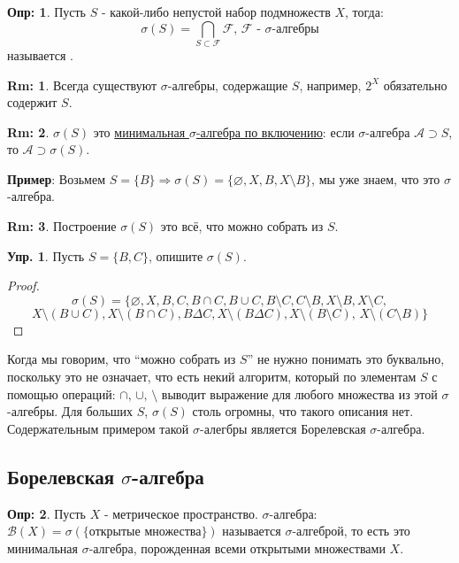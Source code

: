 \documentclass[12pt]{article}
\newcommand{\MA}{\mathcal{A}}
\newcommand{\MB}{\mathcal{B}}
\newcommand{\MF}{\mathcal{F}}
\newcommand{\VN}{\varnothing}
\theoremstyle{definition}
\newtheorem{defn}{Опр:}
\newtheorem{rem}{Rm:}
\newtheorem{exrc}{Упр.}
\begin{document}
\begin{defn}
	Пусть $S$ - какой-либо непустой набор подмножеств $X$, тогда: 
	$$
		\sigma(S) = \bigcap\limits_{S \subset \MF}\MF, \, \MF \text{ - } \sigma\text{-алгебры}
	$$ 
	называется .
\end{defn}
\begin{rem}
	Всегда существуют $\sigma$-алгебры, содержащие $S$, например, $2^X$ обязательно содержит $S$.
\end{rem}
\begin{rem}
	$\sigma(S)$ это \uline{минимальная $\sigma$-алгебра по включению}: если $\sigma$-алгебра $\MA \supset S$, то $\MA \supset \sigma(S)$.
\end{rem}

\textbf{Пример}: Возьмем $S = \{B\} \Rightarrow \sigma(S) = \{\VN,X, B, X \setminus B\}$, мы уже знаем, что это $\sigma$-алгебра.

\begin{rem}
	Построение $\sigma(S)$ это всё, что можно собрать из $S$.
\end{rem}
\begin{exrc}
	Пусть $S = \{B, C\}$, опишите $\sigma(S)$.
\end{exrc}
\begin{proof}
	$$
		\sigma(S) = \{\VN, X, B, C, B \cap C, B \cup C, B \setminus C, C \setminus B, X \setminus B, X \setminus C, 
	$$
	$$
		X \setminus (B \cup C), X \setminus (B \cap C), B \Delta C, X \setminus(B \Delta C), X \setminus (B\setminus C), \, X \setminus ( C \setminus B) \}
	$$
\end{proof}

Когда мы говорим, что ``можно собрать из $S$'' не нужно понимать это буквально, поскольку это не означает, что есть некий алгоритм, который по элементам $S$ с помощью операций: $\cap, \, \cup, \, \setminus$ выводит выражение для любого множества из этой $\sigma$-алгебры. Для больших $S$, $\sigma(S)$ столь огромны, что такого описания нет. Содержательным примером такой $\sigma$-алегбры является Борелевская $\sigma$-алгебра.

\subsection*{Борелевская $\sigma$-алгебра}

\begin{defn}
	Пусть $X$ - метрическое пространство. $\sigma$-алгебра: $\MB(X) = \sigma(\{\text{открытые множества}\})$ называется  $\sigma$-алгеброй, то есть это минимальная $\sigma$-алгебра, порожденная всеми открытыми множествами $X$.
\end{defn}
\end{document}
